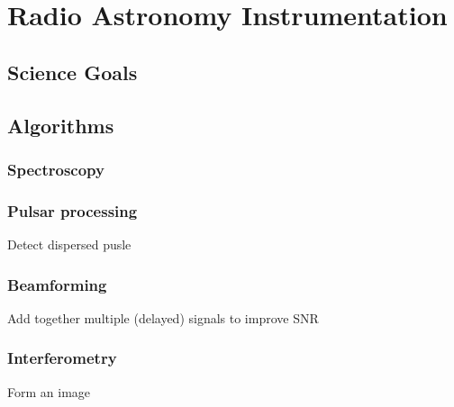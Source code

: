 \chapter{Radio Astronomy Instrumentation}

\section{Science Goals}
\section{Algorithms}
\subsection{Spectroscopy}
\subsection{Pulsar processing}
Detect dispersed pusle
\subsection{Beamforming}
Add together multiple (delayed) signals to improve SNR
\subsection{Interferometry}
Form an image
